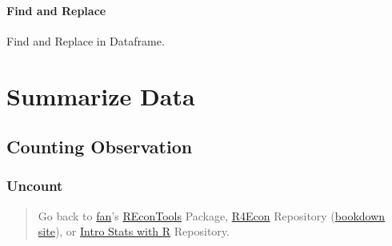 \documentclass[
]{book}
\newenvironment{Shaded}{\begin{snugshade}}{\end{snugshade}}
\newcommand{\CommentTok}[1]{\textcolor[rgb]{0.56,0.35,0.01}{\textit{#1}}}
\newcommand{\KeywordTok}[1]{\textcolor[rgb]{0.13,0.29,0.53}{\textbf{#1}}}
\newcommand{\NormalTok}[1]{#1}
\newcommand{\OperatorTok}[1]{\textcolor[rgb]{0.81,0.36,0.00}{\textbf{#1}}}
\newcommand{\StringTok}[1]{\textcolor[rgb]{0.31,0.60,0.02}{#1}}
\begin{document}
\hypertarget{find-and-replace-1}{%
\subsubsection{Find and Replace}\label{find-and-replace-1}}

Find and Replace in Dataframe.

\begin{Shaded}
\end{Shaded}

\hypertarget{summarize-data}{%
\chapter{Summarize Data}\label{summarize-data}}

\hypertarget{counting-observation}{%
\section{Counting Observation}\label{counting-observation}}

\hypertarget{uncount}{%
\subsection{Uncount}\label{uncount}}

\begin{quote}
Go back to \href{http://fanwangecon.github.io/}{fan}'s \href{https://fanwangecon.github.io/REconTools/}{REconTools} Package, \href{https://fanwangecon.github.io/R4Econ/}{R4Econ} Repository (\href{https://fanwangecon.github.io/R4Econ/bookdown}{bookdown site}), or \href{https://fanwangecon.github.io/Stat4Econ/}{Intro Stats with R} Repository.
\end{quote}
\end{document}
